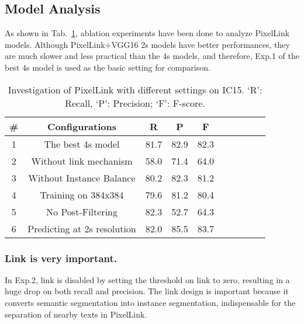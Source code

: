 \documentclass[letterpaper]{article} \usepackage{aaai18}  \usepackage{times}  \usepackage{helvet}  \usepackage{courier}  \usepackage{url}  \usepackage{graphicx}
\begin{document}
	\subsection{Model Analysis}
	\label{sec:model-analysis}
	As shown in Tab.~\ref{table:ablation-results}, ablation experiments have been done to analyze PixelLink models.
	Although PixelLink+VGG16 2s models have better performances, they are much slower and less practical than the 4s models, and therefore, Exp.1 of the best 4s model is used as the basic setting for comparison.
	\begin{table}[!ht]
		\caption{Investigation of PixelLink with different settings on IC15. `R': Recall, `P': Precision; `F': F-score.
		}
		\label{table:ablation-results}
		\centering
		\begin{tabular}{|c|c|c|c|c|c|c|c|c|c|}
			\hline
			\#      &Configurations &R      &P      &F    \\
			\hline
			\hline
			1       &The best 4s model  &81.7   &82.9   &82.3 \\
			\hline
			2       &Without link mechanism &58.0   &71.4   &64.0 \\
			\hline
			3       &Without Instance Balance  &80.2   &82.3   &81.2 \\
			\hline
			4       &Training on 384x384 &79.6   &81.2   &80.4 \\
			\hline
			5       &No Post-Filtering &82.3   &52.7   &64.3 \\
			\hline
			6       &Predicting at 2s resolution &82.0   &85.5   &83.7 \\
			\hline
		\end{tabular}
	\end{table}
	\subsubsection{Link is very important.}
	In Exp.2, link is disabled by setting the threshold on link to zero, resulting in a huge drop on both recall and precision. The link design is important because it converts semantic segmentation into instance segmentation, indispensable for the separation of nearby texts in PixelLink.
\end{document}
